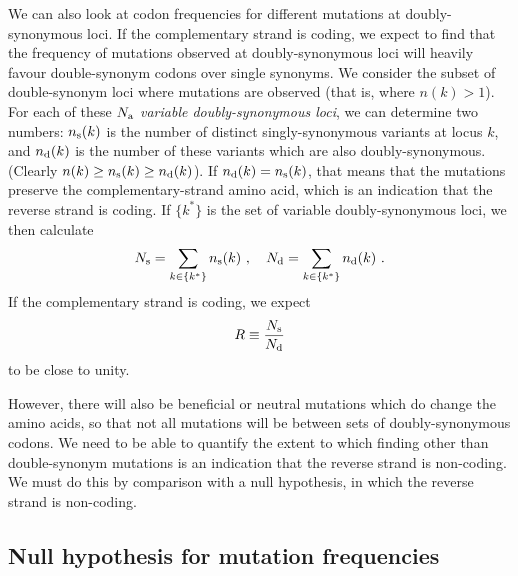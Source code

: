 \documentclass[unnumsec,webpdf,contemporary,large]{oup-authoring-template}%
\theoremstyle{thmstyleone}%
\theoremstyle{thmstyletwo}%
\theoremstyle{thmstylethree}%
\begin{document}
We can also look at codon frequencies for different mutations at doubly-synonymous loci.
If the complementary strand is coding, we expect to find that the frequency of mutations
observed at doubly-synonymous loci will heavily favour double-synonym codons over
single synonyms.  We consider the subset of double-synonym loci where mutations
are observed (that is, where $n(k)>1$). For each of these $N_{\rm a}$ \emph{variable doubly-synonymous loci}, we can determine two numbers: $n_{\rm s}(k)$ is
the number of distinct singly-synonymous variants at locus $k$, and $n_{\rm d}(k)$ is the number
of these variants which are also doubly-synonymous. (Clearly $n(k)\ge n_{\rm s}(k)\ge n_{\rm d}(k)$).
If $n_{\rm d}(k)=n_{\rm s}(k)$, that means that the mutations preserve the complementary-strand
amino acid, which is an indication that the reverse strand is coding. If $\{k^\ast\}$
is the set of variable doubly-synonymous loci, we then
calculate
%
\begin{equation}
\label{eq: 4.2}
N_{\rm s}=\sum_{k\in\{k^\ast\}} n_{\rm s}(k)
\ ,\ \ \
N_{\rm d}=\sum_{k\in\{k^\ast\}} n_{\rm d}(k)
\ .
\end{equation}
%
If the complementary strand is coding, we expect
%
\begin{equation}
\label{eq: 4.3}
R\equiv \frac{N_{\rm s}}{N_{\rm d}}
\end{equation}
%
to be close to unity.

However, there will also be beneficial
or neutral mutations which do change the amino acids, so that not all mutations
will be between sets of doubly-synonymous codons. We need to be able to
quantify the extent to which finding other than double-synonym mutations is
an indication that the reverse strand is non-coding. We must do this by comparison with
a null hypothesis, in which the reverse strand is non-coding.

\subsection{{\bf Null hypothesis for mutation frequencies}}
\label{sec: 4.3}
\end{document}

